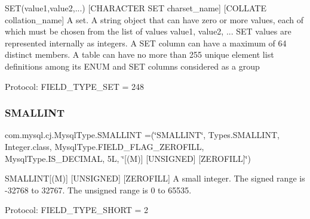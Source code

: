 S\+ET(\textquotesingle{}value1\textquotesingle{},\textquotesingle{}value2\textquotesingle{},...) \mbox{[}C\+H\+A\+R\+A\+C\+T\+ER S\+ET charset\+\_\+name\mbox{]} \mbox{[}C\+O\+L\+L\+A\+TE collation\+\_\+name\mbox{]} A set. A string object that can have zero or more values, each of which must be chosen from the list of values \textquotesingle{}value1\textquotesingle{}, \textquotesingle{}value2\textquotesingle{}, ... S\+ET values are represented internally as integers. A S\+ET column can have a maximum of 64 distinct members. A table can have no more than 255 unique element list definitions among its E\+N\+UM and S\+ET columns considered as a group

Protocol\+: F\+I\+E\+L\+D\+\_\+\+T\+Y\+P\+E\+\_\+\+S\+ET = 248 \mbox{\label{enumcom_1_1mysql_1_1cj_1_1_mysql_type_a6f47bd8cc33374c77f4af4d1b9758081}} 
\subsubsection{\texorpdfstring{S\+M\+A\+L\+L\+I\+NT}{SMALLINT}}
{\footnotesize\ttfamily com.\+mysql.\+cj.\+Mysql\+Type.\+S\+M\+A\+L\+L\+I\+NT =(\char`\"{}S\+M\+A\+L\+L\+I\+NT\char`\"{}, Types.\+S\+M\+A\+L\+L\+I\+NT, Integer.\+class, Mysql\+Type.\+F\+I\+E\+L\+D\+\_\+\+F\+L\+A\+G\+\_\+\+Z\+E\+R\+O\+F\+I\+LL, Mysql\+Type.\+I\+S\+\_\+\+D\+E\+C\+I\+M\+AL, 5\+L, \char`\"{}\mbox{[}(\+M)\mbox{]} \mbox{[}\+U\+N\+S\+I\+G\+N\+E\+D\mbox{]} \mbox{[}\+Z\+E\+R\+O\+F\+I\+L\+L\mbox{]}\char`\"{})}

S\+M\+A\+L\+L\+I\+NT\mbox{[}(M)\mbox{]} \mbox{[}U\+N\+S\+I\+G\+N\+ED\mbox{]} \mbox{[}Z\+E\+R\+O\+F\+I\+LL\mbox{]} A small integer. The signed range is -\/32768 to 32767. The unsigned range is 0 to 65535.

Protocol\+: F\+I\+E\+L\+D\+\_\+\+T\+Y\+P\+E\+\_\+\+S\+H\+O\+RT = 2 \mbox{\label{enumcom_1_1mysql_1_1cj_1_1_mysql_type_ae37a6ba8bf5532916dded17e40a94216}} 
